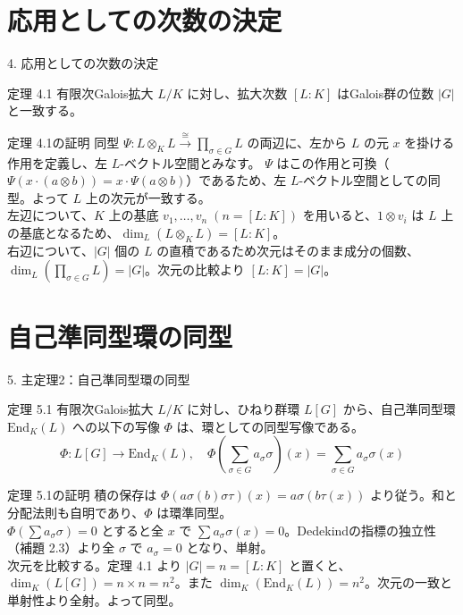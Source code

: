\documentclass[11pt]{beamer}
\begin{document}
\section{応用としての次数の決定}
\begin{frame}[allowframebreaks]{4. 応用としての次数の決定}
    \begin{block}{定理 4.1}
        有限次Galois拡大 $L/K$ に対し、拡大次数 $[L:K]$ はGalois群の位数 $|G|$ と一致する。
    \end{block}
    \begin{block}{定理 4.1の証明}
        同型 $\Psi: L \otimes_K L \xrightarrow{\cong} \prod_{\sigma \in G} L$ の両辺に、左から $L$ の元 $x$ を掛ける作用を定義し、左 $L$-ベクトル空間とみなす。
        $\Psi$ はこの作用と可換（$\Psi(x \cdot (a \otimes b)) = x \cdot \Psi(a \otimes b)$）であるため、左 $L$-ベクトル空間としての同型。よって $L$ 上の次元が一致する。\\
        左辺について、$K$ 上の基底 $v_1, \dots, v_n \; (n = [L:K])$ を用いると、$1 \otimes v_i$ は $L$ 上の基底となるため、$\dim_L(L \otimes_K L) = [L:K]$。\\
        右辺について、$|G|$ 個の $L$ の直積であるため次元はそのまま成分の個数、$\dim_L(\prod_{\sigma \in G} L) = |G|$。次元の比較より $[L:K] = |G|$。
    \end{block}
\end{frame}

\section{自己準同型環の同型}
\begin{frame}[allowframebreaks]{5. 主定理2：自己準同型環の同型}
    \begin{block}{定理 5.1}
        有限次Galois拡大 $L/K$ に対し、ひねり群環 $L[G]$ から、自己準同型環 $\mathrm{End}_K(L)$ への以下の写像 $\Phi$ は、環としての同型写像である。
        \[ \Phi: L[G] \longrightarrow \mathrm{End}_K(L), \quad \Phi\left( \sum_{\sigma \in G} a_\sigma \sigma \right)(x) = \sum_{\sigma \in G} a_\sigma \sigma(x) \]
    \end{block}
    \begin{block}{定理 5.1の証明}
        積の保存は $\Phi(a\sigma(b)\sigma\tau)(x) = a\sigma(b\tau(x))$ より従う。和と分配法則も自明であり、$\Phi$ は環準同型。\\
        $\Phi(\sum a_\sigma \sigma) = 0$ とすると全 $x$ で $\sum a_\sigma \sigma(x) = 0$。Dedekindの指標の独立性（補題 2.3）より全 $\sigma$ で $a_\sigma = 0$ となり、単射。\\
        次元を比較する。定理 4.1 より $|G| = n = [L:K]$ と置くと、$\dim_K(L[G]) = n \times n = n^2$。また $\dim_K(\mathrm{End}_K(L)) = n^2$。次元の一致と単射性より全射。よって同型。
    \end{block}
\end{frame}
\end{document}
